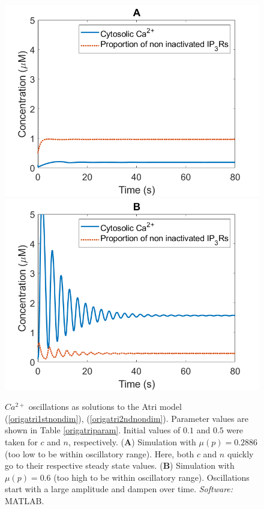 \begin{figure}[!htbp]
\centering
{}
  \includegraphics[width=\linewidth]{Chapters/2_Ca2+_Models/extras/originalatrimu0.5.png}
\endminipage\hfill\\
  \includegraphics[width=\linewidth]{Chapters/2_Ca2+_Models/extras/originalatri1.5.png}
\endminipage\hfill
\caption{$Ca^{2+}$ oscillations as solutions to the Atri model (\ref{origatri1stnondim}), (\ref{origatri2ndnondim}). Parameter values are shown in Table \ref{origatriparam}. Initial values of $0.1$ and $0.5$ were taken for $c$ and $n$, respectively. (\textbf{A}) Simulation with $\mu(p)=0.2886$ (too low to be within oscillatory range). Here, both $c$ and $n$ quickly go to their respective steady state values. (\textbf{B}) Simulation with $\mu(p)=0.6$ (too high to be within oscillatory range). Oscillations start with a large amplitude and dampen over time. \textit{Software:} MATLAB.}\label{figmuphighlow}
\end{figure}

